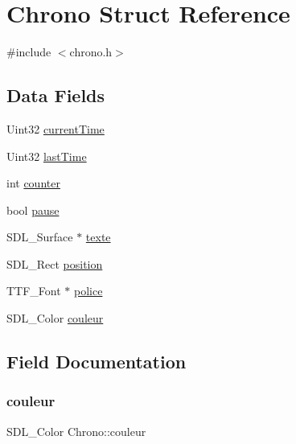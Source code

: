 \hypertarget{structChrono}{}\section{Chrono Struct Reference}
\label{structChrono}


{\ttfamily \#include $<$chrono.\+h$>$}

\subsection*{Data Fields}
\begin{DoxyCompactItemize}
\item 
Uint32 \hyperlink{structChrono_a3061de9a7108e54394d1d0e24a0ffc44}{current\+Time}
\item 
Uint32 \hyperlink{structChrono_a5f7678a92f46de2036caacb5b6f1e0a4}{last\+Time}
\item 
int \hyperlink{structChrono_ac3290e54ec8f6209808638edfee599fb}{counter}
\item 
bool \hyperlink{structChrono_a27a67b8bc1f8f46ad870a40aca82894d}{pause}
\item 
S\+D\+L\+\_\+\+Surface $\ast$ \hyperlink{structChrono_aa9e2794c88d9bc44f89aca45c4d7c55a}{texte}
\item 
S\+D\+L\+\_\+\+Rect \hyperlink{structChrono_a87a2242ec61dc7371f4a499a496edb42}{position}
\item 
T\+T\+F\+\_\+\+Font $\ast$ \hyperlink{structChrono_a57542d11a99ebc2675c72b0161ac5ab6}{police}
\item 
S\+D\+L\+\_\+\+Color \hyperlink{structChrono_a4d1eaa788972d858bcc6288b07768b5a}{couleur}
\end{DoxyCompactItemize}


\subsection{Field Documentation}
\mbox{\label{structChrono_a4d1eaa788972d858bcc6288b07768b5a}} 
\subsubsection{\texorpdfstring{couleur}{couleur}}
{\footnotesize\ttfamily S\+D\+L\+\_\+\+Color Chrono\+::couleur}

\mbox{\label{structChrono_ac3290e54ec8f6209808638edfee599fb}} 
